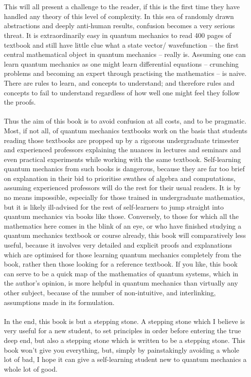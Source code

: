 \\\\
This will all present a challenge to the reader, if this is the first time they have handled any theory of this level of complexity. In this sea of randomly drawn abstractions and deeply anti-human results, confusion becomes a very serious threat. It is extraordinarily easy in quantum mechanics to read 400 pages of textbook and still have little clue what a state vector/ wavefunction -- the first central mathematical object in quantum mechanics -- really is. Assuming one can learn quantum mechanics as one might learn differential equations -- crunching problems and becoming an expert through practising the mathematics -- is naive. There are rules to learn, and concepts to understand; and therefore rules and concepts to fail to understand regardless of how well one might feel they follow the proofs.
\\\\
Thus the aim of this book is to avoid confusion at all costs, and to be pragmatic. Most, if not all, of quantum mechanics textbooks work on the basis that students reading those textbooks are propped up by a rigorous undergraduate trimester and experienced professors explaining the nuances in lectures and seminars and even practical experiments while working with the same textbook. Self-learning quantum mechanics from such books is dangerous, because they are far too brief on explanation in their bid to prioritise swathes of algebra and computations, assuming experienced professors will do the rest for their usual readers. It is by no means impossible, especially for those trained in undergraduate mathematics, but it is likely ill-advised for the rest of self-learners to jump straight into quantum mechanics via books like those. Conversely, to those for which all the mathematics here comes in the blink of an eye, or who have finished studying a quantum mechanics textbook or course already, this book will comparatively less useful, because it involves very detailed and explicit proofs and explanations which are optimised for those learning quantum mechanics completely from the book, rather then those looking for a reference textbook. If you like, this book can serve to be a quick map of the mathematics of quantum systems, which in the author's opinion, is more helpful in quantum mechanics than virtually any other subject, because of the number of non-intuitive, and interlinking, assumptions made in its formulation.
\\\\
In the end, this book is but a stepping stone. A stepping stone which I believe is very useful for a new student, to set principles in order before entering the true deep end, but also a stepping stone which is written to be a stepping stone. This book won't give you everything, but, simply by painstakingly avoiding a whole lot of bad, I hope it can give a self-learning student new to quantum mechanics a whole lot of good.
